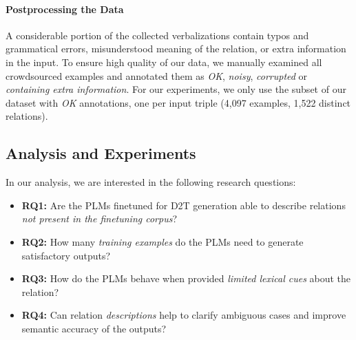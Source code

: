 \paragraph{Postprocessing the Data}
A considerable portion of the collected verbalizations contain typos and grammatical errors, misunderstood meaning of the relation, or extra information in the input. To ensure high quality of our data, we manually examined all crowdsourced examples and annotated them as \textit{OK}, \textit{noisy}, \textit{corrupted} or \textit{containing extra information}. For our experiments, we only use the subset of our dataset with \textit{OK} annotations, one per input triple (4,097 examples, 1,522 distinct relations).


\subsection{Analysis and Experiments}
\label{sec:rel2text:analysis}
In our analysis, we are interested in the following research questions:
\begin{itemize}
    \item \textbf{RQ1:} Are the PLMs finetuned for D2T generation able to describe relations \textit{not present in the finetuning corpus}?
    \item \textbf{RQ2:} How many \textit{training examples} do the PLMs need to generate satisfactory outputs?
    \item \textbf{RQ3:} How do the PLMs behave when provided \textit{limited lexical cues} about the relation?
    \item \textbf{RQ4:} Can relation \textit{descriptions} help to clarify ambiguous cases and improve semantic accuracy of the outputs?
\end{itemize}

